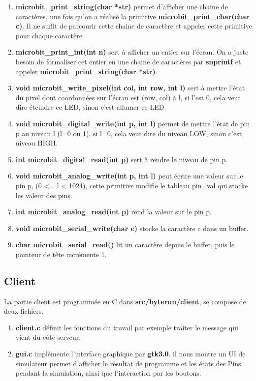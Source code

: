 \documentclass[14px]{article}
\begin{document}
\begin{enumerate}
		\item \textbf{microbit\_print\_string(char *str)} permet d'afficher une chaine de caractères, une fois qu'on a réalisé la primitive \textbf{microbit\_print\_char(char c)}. Il ne suffit de parcourir cette chaine de caractère et appeler cette primitive pour chaque caractère.
		\item \textbf{microbit\_print\_int(int n)} sert à afficher un entier sur l'écran. On a juste besoin de formaliser cet entier en une chaine de caractères par \textbf{snprintf} et appeler \textbf{microbit\_print\_string(char *str)}.
		\item \textbf{void microbit\_write\_pixel(int col, int row, int l)} sert à mettre l'état du pixel dont coordonnées sur l'écran est (row, col) à l, si l’est 0, cela veut dire éteindre ce LED, sinon c'est allumer ce LED.
		\item \textbf{void microbit\_digital\_write(int p, int l)} permet de mettre l'état de pin p au niveau l (l=0 ou 1), si l=0, cela veut dire du niveau LOW, sinon c'est niveau HIGH.
		\item \textbf{int microbit\_digital\_read(int p)} sert à rendre le niveau de pin p.
		\item \textbf{void microbit\_analog\_write(int p, int l)} peut écrire une valeur sur le pin p, (0 <= l < 1024), cette primitive modifie le tableau pin\_val qui stocke les valeur des pins.
		\item \textbf{int microbit\_analog\_read(int p)} rend la valeur sur le pin p.
		\item \textbf{void microbit\_serial\_write(char c)} stocke la caractère c dans un buffer.
		\item \textbf{char microbit\_serial\_read()} lit un caractère depuis le buffer, puis le pointeur de tête incrémente 1.
		
	\end{enumerate}
	
	
	
	\subsection{Client}
	La partie client est programmée en C dans \textbf{src/byterun/client}, se compose de deux fichiers.
	\begin{enumerate}
		\item \textbf{client.c} définit les fonctions du travail par exemple traiter le message qui vient du côté serveur.
		
		\item \textbf{gui.c} implémente l'interface graphique par \textbf{gtk3.0}.
		il nous montre un UI de simulateur permet d'afficher le résultat de programme et les états des Pins pendant la simulation, ainsi que l'interaction par les boutons.\\
	\end{enumerate}
	
\end{document}
